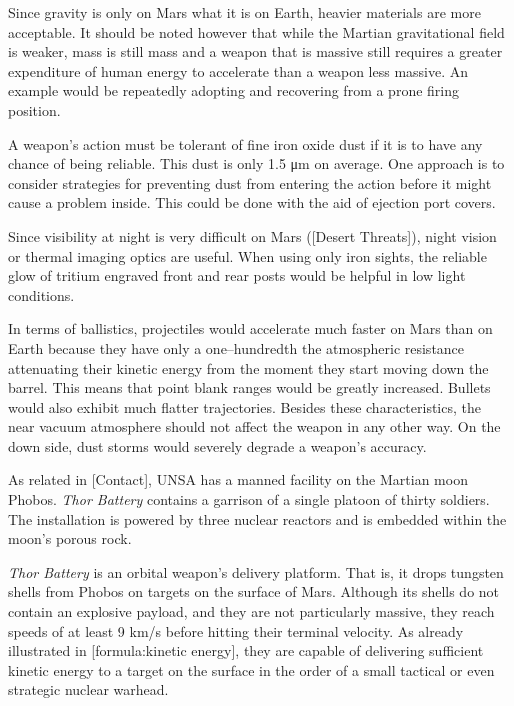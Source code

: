Since gravity is only  on Mars what it is on Earth, heavier materials are more acceptable. It should be noted however that while the Martian gravitational field is weaker, mass is still mass and a weapon that is massive still requires a greater expenditure of human energy to accelerate than a weapon less massive. An example would be repeatedly adopting and recovering from a prone firing position.

A weapon's action must be tolerant of fine iron oxide dust if it is to have any chance of being reliable. This dust is only 1.5 μm on average. One approach is to consider strategies for preventing dust from entering the action before it might cause a problem inside. This could be done with the aid of ejection port covers.

Since visibility at night is very difficult on Mars ([Desert Threats]), night vision or thermal imaging optics are useful. When using only iron sights, the reliable glow of tritium engraved front and rear posts would be helpful in low light conditions.

In terms of ballistics, projectiles would accelerate much faster on Mars than on Earth because they have only a one--hundredth the atmospheric resistance attenuating their kinetic energy from the moment they start moving down the barrel. This means that point blank ranges would be greatly increased. Bullets would also exhibit much flatter trajectories. Besides these characteristics, the near vacuum atmosphere should not affect the weapon in any other way. On the down side, dust storms would severely degrade a weapon's accuracy.


As related in [Contact], UNSA has a manned facility on the Martian moon Phobos. {\it Thor Battery} contains a garrison of a single platoon of thirty soldiers. The installation is powered by three nuclear reactors and is embedded within the moon's porous rock.

{\it Thor Battery} is an orbital weapon's delivery platform. That is, it drops tungsten shells from Phobos on targets on the surface of Mars. Although its shells do not contain an explosive payload, and they are not particularly massive, they reach speeds of at least 9 km/s before hitting their terminal velocity. As already illustrated in [formula:kinetic energy], they are capable of delivering sufficient kinetic energy to a target on the surface in the order of a small tactical or even strategic nuclear warhead.

